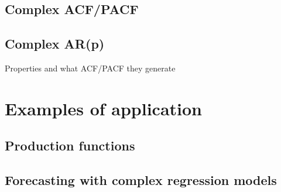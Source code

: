 \documentclass[
]{book}
\begin{document}
\hypertarget{complex-acfpacf}{%
\section{Complex ACF/PACF}\label{complex-acfpacf}}

\hypertarget{complex-arp}{%
\section{Complex AR(p)}\label{complex-arp}}

Properties and what ACF/PACF they generate

\hypertarget{Examples}{%
\chapter{Examples of application}\label{Examples}}

\hypertarget{production-functions}{%
\section{Production functions}\label{production-functions}}

\hypertarget{forecasting-with-complex-regression-models}{%
\section{Forecasting with complex regression models}\label{forecasting-with-complex-regression-models}}

  
\end{document}
